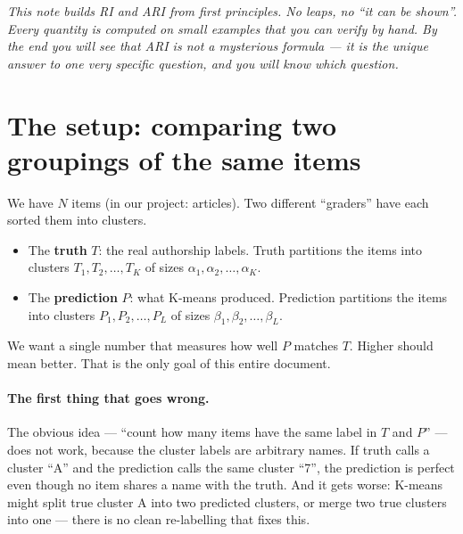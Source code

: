 \documentclass[11pt]{article}
\title{\vspace{-2.0em}{\color{accent}\textsf{\bfseries The Rand Index and the Adjusted Rand Index, from the ground up}}}
\author{}
\date{}
\begin{document}
\maketitle
\vspace{-3.0em}

\noindent
\textit{This note builds RI and ARI from first principles. No leaps, no
``it can be shown''. Every quantity is computed on small examples that you
can verify by hand. By the end you will see that ARI is not a mysterious
formula --- it is the unique answer to one very specific question, and you
will know which question.}

\section{The setup: comparing two groupings of the same items}

We have $N$ items (in our project: articles). Two different ``graders'' have
each sorted them into clusters.

\begin{itemize}\setlength\itemsep{1pt}
  \item The \textbf{truth} $T$: the real authorship labels.
        Truth partitions the items into clusters
        $T_1, T_2, \ldots, T_K$ of sizes $\alpha_1, \alpha_2, \ldots, \alpha_K$.
  \item The \textbf{prediction} $P$: what K-means produced.
        Prediction partitions the items into clusters
        $P_1, P_2, \ldots, P_L$ of sizes $\beta_1, \beta_2, \ldots, \beta_L$.
\end{itemize}

We want a single number that measures how well $P$ matches $T$. Higher
should mean better. That is the only goal of this entire document.

\paragraph{The first thing that goes wrong.}
The obvious idea --- ``count how many items have the same label in $T$ and
$P$'' --- does not work, because the cluster labels are arbitrary names.
If truth calls a cluster ``A'' and the prediction calls the same cluster
``7'', the prediction is perfect even though no item shares a name with the
truth. And it gets worse: K-means might split true cluster A into two
predicted clusters, or merge two true clusters into one --- there is no
clean re-labelling that fixes this.
\end{document}
